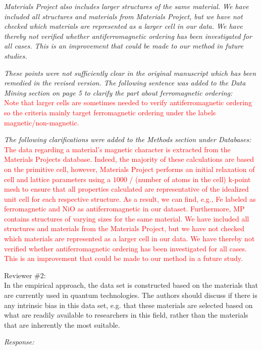 \documentclass[11pt, a4paper]{letter} %
\newcommand{\mrk}[1]{\textcolor{red}{#1}}
\begin{document}
\textit{Materials Project also includes larger structures of the same material. We have included all structures and materials from Materials Project, but we have not checked which materials are represented as a larger cell in our data. We have thereby not verified whether antiferromagnetic ordering has been investigated for all cases. This is an improvement that could be made to our method in future studies.}

\textit{These points were not sufficiently clear in the original manuscript which has been remedied in the revised version. The following sentence was added to the Data Mining section on page 5 to clarify the part about ferromagnetic ordering: } \\
\mrk{Note that larger cells are sometimes needed to verify antiferromagnetic ordering so the criteria mainly target ferromagnetic ordering under the labels magnetic/non-magnetic.}  

\textit{The following clarifications were added to the Methods section under Databases:} \\ 
\mrk{The data regarding a material's magnetic character is extracted from the Materials Projects database. Indeed, the majority of these calculations are based on the primitive cell, however, Materials Project performs an initial relaxation of cell and lattice parameters using a $1000$ / (number of atoms in the cell) k-point mesh to ensure that all properties calculated are representative of the idealized unit cell for each respective structure. As a result, we can find, e.g., Fe labeled as ferromagnetic and NiO as antiferromagnetic in our dataset. Furthermore, MP contains structures of varying sizes for the same material. We have included all structures and materials from the Materials Project, but we have not checked which materials are represented as a larger cell in our data. We have thereby not verified whether antiferromagnetic ordering has been investigated for all cases. This is an improvement that could be made to our method in a future study.} 


Reviewer \#2: \\
In the empirical approach, the data set is constructed based on the materials that are currently used in quantum technologies. The authors should discuss if there is any intrinsic bias in this data set, e.g. that these materials are selected based on what are readily available to researchers in this field, rather than the materials that are inherently the most suitable.

\textit{Response:}
\end{document}
